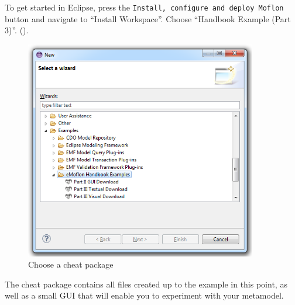 \begin{stepbystep}

\item To get started in Eclipse, press the \texttt{Install, configure and deploy Moflon} button and navigate to ``Install Workspace''. Choose ``Handbook Example (Part 3)''.
().

\begin{figure}[htbp]
	\centering
  \includegraphics[width=0.9\textwidth]{../../org.moflon.doc.handbook.03_storyDiagrams/01_LeitnersBoxReviewed/lbrImages/eclipse_downloadWizard}
	\caption{Choose a cheat package}
	\label{eclipse:downloadWizard}
\end{figure}

\item The cheat package contains all files created up to the example in this point, as well as a small GUI that will enable
you to experiment with your metamodel.

\newpage

\vspace*{0.5cm}
%
%
%
\end{stepbystep}
